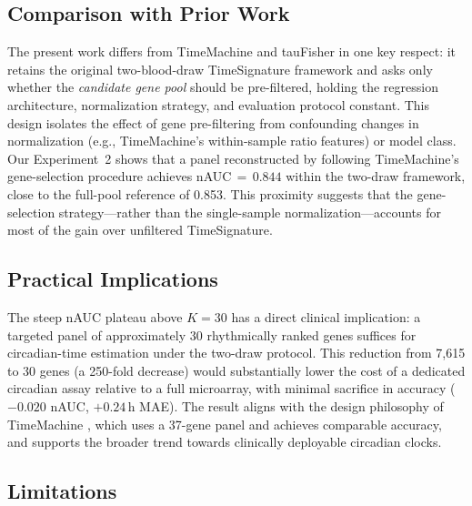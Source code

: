 \documentclass[10pt,a4paper]{article}
\begin{document}
\subsection{Comparison with Prior Work}

The present work differs from TimeMachine and tauFisher in one key
respect: it retains the original two-blood-draw TimeSignature
framework and asks only whether the \emph{candidate gene pool} should
be pre-filtered, holding the regression architecture, normalization
strategy, and evaluation protocol constant.
This design isolates the effect of gene pre-filtering from
confounding changes in normalization (e.g., TimeMachine's
within-sample ratio features) or model class.
Our Experiment~2 shows that a panel reconstructed by following
TimeMachine's gene-selection procedure achieves nAUC\,${=}\,0.844$
within the two-draw framework, close to the full-pool reference of
0.853.
This proximity suggests that the gene-selection strategy---rather
than the single-sample normalization---accounts for most of the gain
over unfiltered TimeSignature.

\subsection{Practical Implications}

The steep nAUC plateau above $K = 30$ has a direct clinical
implication: a targeted panel of approximately 30 rhythmically ranked
genes suffices for circadian-time estimation under the two-draw
protocol.
This reduction from 7,615 to 30 genes (a 250-fold decrease) would
substantially lower the cost of a dedicated circadian assay relative
to a full microarray, with minimal sacrifice in accuracy
($-0.020$ nAUC, $+0.24$\,h MAE).
The result aligns with the design philosophy of TimeMachine
\citep{Huang2024}, which uses a 37-gene panel and achieves comparable
accuracy, and supports the broader trend towards clinically deployable
circadian clocks.

\subsection{Limitations}
\end{document}
